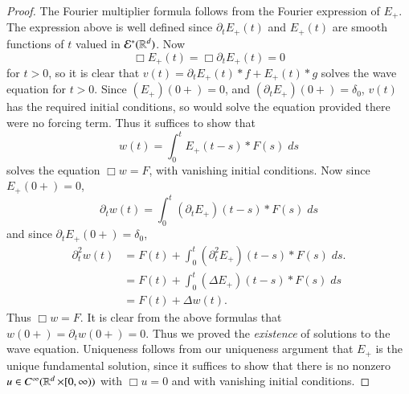 \begin{proof}
    The Fourier multiplier formula follows from the Fourier expression of $E_+$. The expression above is well defined since $\partial_t E_+(t)$ and $E_+(t)$ are smooth functions of $t$ valued in $\mathcal{E}^*(\operatorname{\mathbb{R}}^d)$. Now
    \[ \Box E_+(t) = \Box \partial_t E_+(t) = 0 \]
    for $t > 0$, so it is clear that $v(t) = \partial_t E_+(t) * f + E_+(t) * g$ solves the wave equation for $t > 0$. Since $(E_+)(0+) = 0$, and $(\partial_t E_+)(0+) = \delta_0$, $v(t)$ has the required initial conditions, so would solve the equation provided there were no forcing term. Thus it suffices to show that
    \[ w(t) = \int_0^t E_+(t-s) * F(s)\; ds \]
    solves the equation $\Box w = F$, with vanishing initial conditions. Now since $E_+(0+) = 0$,
    \[ \partial_t w(t) = \int_0^t (\partial_t E_+)(t - s) * F(s)\; ds \]
    and since $\partial_t E_+(0+) = \delta_0$,
    \begin{align*}
        \partial_t^2 w(t) &= F(t) + \int_0^t (\partial_t^2 E_+)(t - s) * F(s)\; ds.\\
        &= F(t) + \int_0^t (\Delta E_+)(t - s) * F(s)\; ds\\
        &= F(t) + \Delta w(t).
    \end{align*}
    Thus $\Box w = F$. It is clear from the above formulas that $w(0+) = \partial_t w(0+) = 0$. Thus we proved the \emph{existence} of solutions to the wave equation. Uniqueness follows from our uniqueness argument that $E_+$ is the unique fundamental solution, since it suffices to show that there is no nonzero $u \in C^\infty(\operatorname{\mathbb{R}}^d \times [0,\infty))$ with $\Box u = 0$ and with vanishing initial conditions.
\end{proof}

